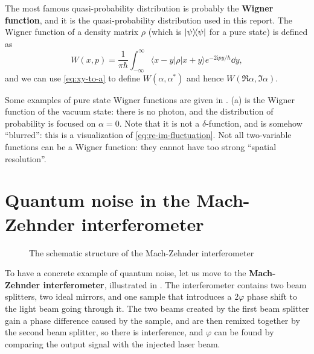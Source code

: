 \documentclass[hyperref, a4paper]{article}
\newcommand*{\ii}{\mathrm{i}}
\newcommand*{\concept}[1]{{\textbf{#1}}}
\begin{document}
The most famous quasi-probability distribution is probably the \concept{Wigner function},
and it is the quasi-probability distribution used in this report.
The Wigner function of a density matrix $\rho$ (which is $\dyad{\psi}$ for a pure state) 
is defined as \cite{scully1999quantum}
\begin{equation}
    W(x, p)=\frac{1}{\pi \hbar} \int_{-\infty}^{\infty}\langle x-y|{\rho}| x+y\rangle e^{-2 \ii p y / \hbar} \dd y,
\end{equation}
and we can use \eqref{eq:xy-to-a} to define $W(\alpha, \alpha^*)$ and hence $W(\Re \alpha, \Im \alpha)$.

Some examples of pure state Wigner functions are given in .
(a) is the Wigner function of the vacuum state:
there is no photon, 
and the distribution of probability is focused on $\alpha = 0$.
Note that it is not a $\delta$-function,
and is somehow ``blurred'':
this is a visualization of \eqref{eq:re-im-fluctuation}.
Not all two-variable functions can be a Wigner function:
they cannot have too strong ``spatial resolution''.

\section{Quantum noise in the Mach-Zehnder interferometer}\label{sec:interferometer}

\begin{figure}
    \centering
    
    \caption{The schematic structure of the Mach-Zehnder interferometer}
    \label{fig:mz-inter}
\end{figure}

To have a concrete example of quantum noise, 
let us move to the \concept{Mach-Zehnder interferometer},
illustrated in .
The interferometer contains two beam splitters, 
two ideal mirrors, 
and one sample that introduces a $2\varphi$ phase shift to the light beam going through it.
The two beams created by the first beam splitter gain a phase difference caused by the sample,
and are then remixed together by the second beam splitter,
so there is interference,
and $\varphi$ can be found by comparing the output signal with the injected laser beam.
\end{document}
